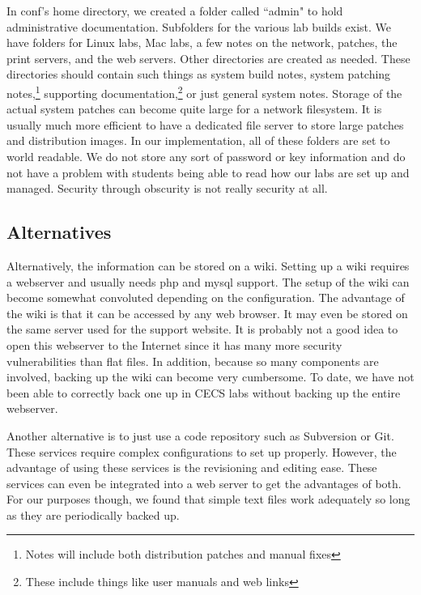 In conf's home directory, we created a folder called ``admin" to hold administrative documentation.  Subfolders for the various lab builds exist.  We have folders for Linux labs, Mac labs, a few notes on the network, patches, the print servers, and the web servers.  Other directories are created as needed.  These directories should contain such things as system build notes, system patching notes,\footnote{Notes will include both distribution patches and manual fixes} supporting documentation,\footnote{These include things like user manuals and web links} or just general system notes.  Storage of the actual system patches can become quite large for a network filesystem.  It is usually much more efficient to have a dedicated file server to store large patches and distribution images.  In our implementation, all of these folders are set to world readable.  We do not store any sort of password or key information and do not have a problem with students being able to read how our labs are set up and managed.  Security through obscurity is not really security at all.  

\subsection{Alternatives}

Alternatively, the information can be stored on a wiki.  Setting up a wiki requires a webserver and usually needs php and mysql support.  The setup of the wiki can become somewhat convoluted depending on the configuration.  The advantage of the wiki is that it can be accessed by any web browser.  It may even be stored on the same server used for the support website.  It is probably not a good idea to open this webserver to the Internet since it has many more security vulnerabilities than flat files.  In addition, because so many components are involved, backing up the wiki can become very cumbersome.  To date, we have not been able to correctly back one up in CECS labs without backing up the entire webserver.  

Another alternative is to just use a code repository such as Subversion or Git.  These services require complex configurations to set up properly.  However, the advantage of using these services is the revisioning and editing ease.  These services can even be integrated into a web server to get the advantages of both.  For our purposes though, we found that simple text files work adequately so long as they are periodically backed up.  
